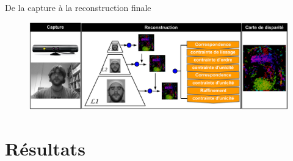 \documentclass[compress,pdf,11pt,xcolor=dvipsnames]{beamer}
\begin{document}
\begin{frame}{De la capture à la reconstruction finale}
\begin{figure}[ht!]
    \includegraphics[width=\textwidth]{img/projSystem}
\end{figure}
\end{frame}

\section{Résultats}
\end{document}
